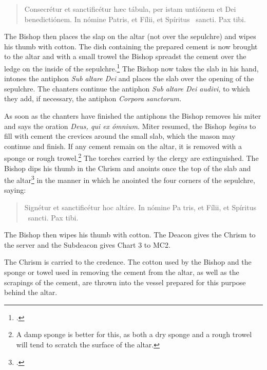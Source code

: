 \documentclass[letterpaper]{report}
\begin{document}
{\begin{quote}
    Conse\cross crétur et sancti\cross ficétur h\ae c tábula, per istam
    untiónem et Dei benedictiónem. In nómine Pa\cross tris, et Fí\cross lii, et
    Spíritus \cross\ sancti. Pax tibi.
\end{quote}

\rubric The Bishop then places the slap on the altar (not over the sepulchre)
and wipes his thumb with cotton. The dish containing the prepared cement is now
brought to the altar and with a small trowel the Bishop spreadst the cement
over the ledge on the inside of the sepulchre.\footcite[The bishop may be
assisted by the mason, and care should be taken that the cement does not fall
on the sack containing the relics.][footnote 1, p. 89.]{consecranda} The Bishop
now takes the slab in his hand, intones the antiphon \textit{Sub altare Dei}
and places the slab over the opening of the sepulchre. The chanters continue
the antiphon \textit{Sub altare Dei audivi,} to which they add, if necessary,
the antiphon \textit{Corpora sanctorum.}

\rubric As soon as the chanters have finished the antiphons the Bishop removes
his miter and says the oration \textit{Deus, qui ex ómnium.} Miter resumed, the
Bishop \textit{begins} to fill with cement the crevices around the small slab,
which the mason may continue and finish. If any cement remain on the altar, it
is removed with a sponge or rough trowel.\footnote{A damp sponge is better for
this, as both a dry sponge and a rough trowel will tend to scratch the surface
of the altar.} The torches carried by the clergy are extinguished. The Bishop
dips his thumb in the Chrism and anoints once the top of the slab and the
altar\footcite[Martinucci, Hartmann, etc., say that the cross should be made
not only on the slab, but also on the portions of the table of the altar near
the slab as indicated by the cut.][footnote 1, p. 90.]{consecranda} in the
manner in which he anointed the four corners of the sepulchre, saying:

\begin{quote}
    Signé\cross tur et sancti\cross ficétur hoc altáre. In nómine Pa\cross
    tris, et Fí\cross lii, et Spíritus \cross\ sancti. Pax tibi.
\end{quote}

The Bishop then wipes his thumb with cotton. The Deacon gives the Chrism to the
server and the Subdeacon gives Chart 3 to MC2.

The Chrism is carried to the credence. The cotton used by the Bishop and the
sponge or towel used in removing the cement from the altar, as well as the
scrapings of the cement, are thrown into the vessel prepared for this purpose
behind the altar.

}
\end{document}

